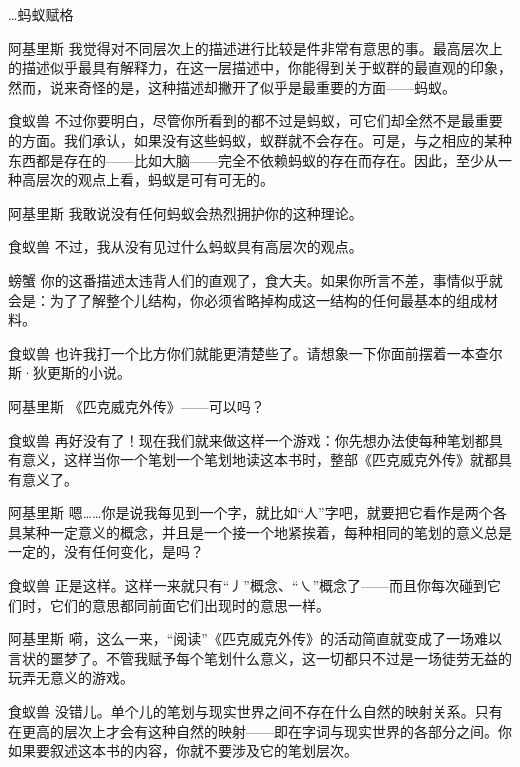 \begin{dialog}{…蚂蚁赋格}
\begin{dialogue}
\item[阿基里斯]我觉得对不同层次上的描述进行比较是件非常有意思的事。最高层次上的描述似乎最具有解释力，在这一层描述中，你能得到关于蚁群的最直观的印象，然而，说来奇怪的是，这种描述却撇开了似乎是最重要的方面——蚂蚁。

\item[食蚁兽]不过你要明白，尽管你所看到的都不过是蚂蚁，可它们却全然不是最重要的方面。我们承认，如果没有这些蚂蚁，蚁群就不会存在。可是，与之相应的某种东西都是存在的——比如大脑——完全不依赖蚂蚁的存在而存在。因此，至少从一种高层次的观点上看，蚂蚁是可有可无的。

\item[阿基里斯]我敢说没有任何蚂蚁会热烈拥护你的这种理论。

\item[食蚁兽]不过，我从没有见过什么蚂蚁具有高层次的观点。

\item[螃蟹]你的这番描述太违背人们的直观了，食大夫。如果你所言不差，事情似乎就会是：为了了解整个儿结构，你必须省略掉构成这一结构的任何最基本的组成材料。

\item[食蚁兽]也许我打一个比方你们就能更清楚些了。请想象一下你面前摆着一本查尔斯·狄更斯的小说。

\item[阿基里斯]《匹克威克外传》——可以吗？

\item[食蚁兽]再好没有了！现在我们就来做这样一个游戏：你先想办法使每种笔划都具有意义，这样当你一个笔划一个笔划地读这本书时，整部《匹克威克外传》就都具有意义了。

\item[阿基里斯]嗯……你是说我每见到一个字，就比如“人”字吧，就要把它看作是两个各具某种一定意义的概念，并且是一个接一个地紧挨着，每种相同的笔划的意义总是一定的，没有任何变化，是吗？

\item[食蚁兽]正是这样。这样一来就只有“㇓”概念、“㇏”概念了——而且你每次碰到它们时，它们的意思都同前面它们出现时的意思一样。

\item[阿基里斯]嗬，这么一来，“阅读”《匹克威克外传》的活动简直就变成了一场难以言状的噩梦了。不管我赋予每个笔划什么意义，这一切都只不过是一场徒劳无益的玩弄无意义的游戏。

\item[食蚁兽]没错儿。单个儿的笔划与现实世界之间不存在什么自然的映射关系。只有在更高的层次上才会有这种自然的映射——即在字词与现实世界的各部分之间。你如果要叙述这本书的内容，你就不要涉及它的笔划层次。


\end{dialogue}
\end{dialog}
